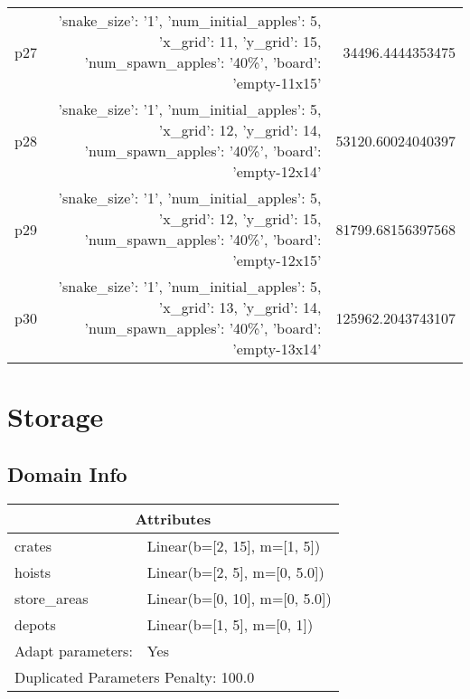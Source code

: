 \documentclass{article}
\begin{document}
\begin{center}
\begin{tabular}{r|r|r}
  p27&{'snake\_size': '1', 'num\_initial\_apples': 5, 'x\_grid': 11, 'y\_grid': 15, 'num\_spawn\_apples': '40\%', 'board': 'empty-11x15'}&34496.4444353475\\
  p28&{'snake\_size': '1', 'num\_initial\_apples': 5, 'x\_grid': 12, 'y\_grid': 14, 'num\_spawn\_apples': '40\%', 'board': 'empty-12x14'}&53120.60024040397\\
  p29&{'snake\_size': '1', 'num\_initial\_apples': 5, 'x\_grid': 12, 'y\_grid': 15, 'num\_spawn\_apples': '40\%', 'board': 'empty-12x15'}&81799.68156397568\\
  p30&{'snake\_size': '1', 'num\_initial\_apples': 5, 'x\_grid': 13, 'y\_grid': 14, 'num\_spawn\_apples': '40\%', 'board': 'empty-13x14'}&125962.2043743107
                            \end{tabular}
                            \end{center}
                    
                            \newpage \section{Storage}
                    \subsection*{Domain Info}

                    \begin{center}
                    \begin{tabular}{p{}p{}}
                    \multicolumn{2}{c}{\bf \large Attributes}\\\midrule
                    crates & Linear(b=[2, 15], m=[1, 5])\\
hoists & Linear(b=[2, 5], m=[0, 5.0])\\
store\_areas & Linear(b=[0, 10], m=[0, 5.0])\\
depots & Linear(b=[1, 5], m=[0, 1])
                    
                    \\\midrule
                    Adapt parameters: & Yes
                
                     \\\midrule
                    \multicolumn{2}{l}{Duplicated Parameters Penalty: 100.0}
                    \end{tabular}
                    \end{center}
                
\end{document}

